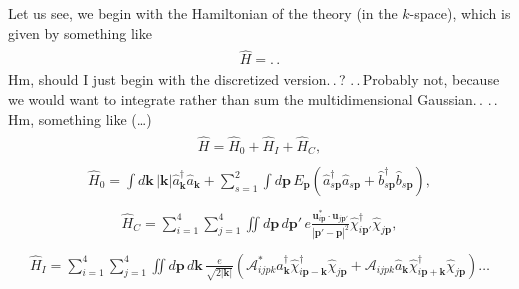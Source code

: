 \documentclass{report}
\begin{document}
Let us see, we begin with the Hamiltonian of the theory (in the $k$-space), which is given by something like
\begin{align}
\begin{aligned}
	\hat H = .\,.
\end{aligned}
\end{align}
Hm, should I just begin with the discretized version.\,.\,? .\,.\,Probably not, because we would want to integrate rather than sum the multidimensional Gaussian.\,. .\,.\,Hm, something like (\ldots)
\begin{align}
\begin{aligned}
	\hat H = \hat H_{0} + \hat H_{I} + \hat H_{C},
\end{aligned}
\end{align}
\begin{align}
\begin{aligned}
	\hat H_{0} = \int d\boldsymbol{k}\, |\boldsymbol{k}| 
		\hat a^\dagger_{\boldsymbol{k}} \hat a_{\boldsymbol{k}} + 
		\sum_{s=1}^2 \int d\boldsymbol{p}\, E_{\boldsymbol{p}} (
			\hat a^\dagger_{s \boldsymbol{p}} \hat a_{s \boldsymbol{p}} + 
			\hat b^\dagger_{s \boldsymbol{p}} \hat b_{s \boldsymbol{p}}
		),
\end{aligned}
\end{align}
\begin{align}
\begin{aligned}
	\hat H_{C} = \sum_{i=1}^4\sum_{j=1}^4 \iint d\boldsymbol{p}\, d\boldsymbol{p}'\, e %
		\frac{\boldsymbol u_{i \boldsymbol{p}}^* \cdot \boldsymbol u_{j \boldsymbol{p}'}}
			{|\boldsymbol{p}' - \boldsymbol{p}|^2} 
		\hat \chi^\dagger_{i \boldsymbol{p'}} \hat \chi_{j \boldsymbol{p}},
\end{aligned}
\end{align}
\begin{align}
\begin{aligned}
	\hat H_{I} = \sum_{i=1}^4\sum_{j=1}^4 \iint d\boldsymbol{p}\, d\boldsymbol{k}\, 
		\frac{e}{\sqrt{2 |\boldsymbol{k}|}}(
			\mathcal{A}_{i j p k}^* \hat a^\dagger_{\boldsymbol{k}}	
				\hat \chi^\dagger_{i \boldsymbol{p} - \boldsymbol{k}} \hat \chi_{j \boldsymbol{p}} +
			\mathcal{A}_{i j p k} \hat a_{\boldsymbol{k}}
				\hat \chi^\dagger_{i \boldsymbol{p} + \boldsymbol{k}} \hat \chi_{j \boldsymbol{p}}
		)\ldots
	\label{H_I_form_01}
\end{aligned}
\end{align}
\end{document}
